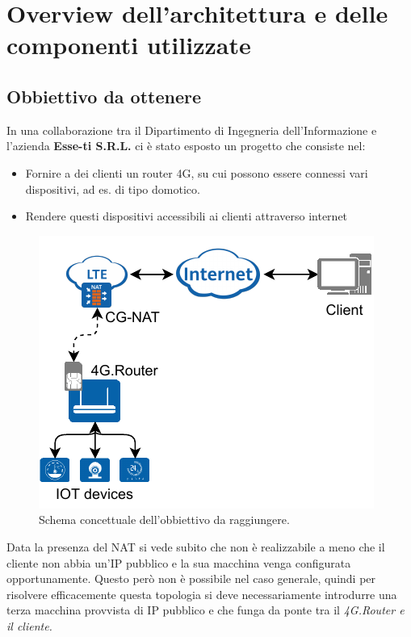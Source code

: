 

\chapter{Overview dell'architettura e delle componenti utilizzate}

\label{ch:overview}

\section{Obbiettivo da ottenere}


In una collaborazione tra il Dipartimento di Ingegneria dell'Informazione e l'azienda \textbf{Esse-ti S.R.L.} ci è stato esposto un progetto che consiste nel:

\begin{itemize}
	\item Fornire a dei clienti un router 4G, su cui possono essere connessi vari dispositivi, ad es. di tipo domotico.
	\item Rendere questi dispositivi accessibili ai clienti attraverso internet
\end{itemize}

\begin{figure}[H]
	\centering
	\includegraphics[width=0.5\linewidth]{immagini/diag-goal}
	\caption{Schema concettuale dell'obbiettivo da raggiungere.}

	\label{fig:schema_concettuale}

\end{figure}

Data la presenza del NAT si vede subito che non è realizzabile a meno che il cliente non abbia un'IP pubblico e la sua macchina venga configurata opportunamente. Questo però non è possibile nel caso generale, quindi per risolvere efficacemente questa topologia si deve necessariamente introdurre una terza macchina provvista di IP pubblico e che funga da ponte tra il \it{4G.Router} e il cliente.


